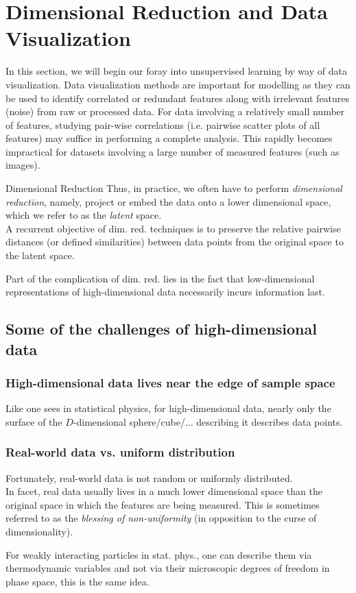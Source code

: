 \section{Dimensional Reduction and Data Visualization}
\label{sec:dimRed}
In this section, we will begin our foray into unsupervised learning by way of data visualization. Data visualization methods are important for modelling as they can be used to identify correlated or redundant features along with irrelevant features (noise) from raw or processed data. For data involving a relatively small number of features, studying pair-wise correlations (i.e. pairwise scatter plots of all features) may suffice in performing a complete analysis. This rapidly becomes impractical for datasets involving a large number of measured features (such as images). \begin{mybox}{Dimensional Reduction}
	Thus, in practice, we often have to perform \emph{dimensional reduction}, namely, project or embed the data onto a lower dimensional space, which we refer to as the \emph{latent} space.\\
	A recurrent objective of dim. red. techniques is to preserve the relative pairwise distances (or defined similarities) between data points from the original space to the latent space.
\end{mybox}
Part of the complication of dim. red. lies in the fact that low-dimensional representations of high-dimensional data necessarily incurs information last.

\subsection{Some of the challenges of high-dimensional data}
\label{subsec:dimRedChallengesData}
\subsubsection{High-dimensional data lives near the edge of sample space}
Like one sees in statistical physics, for high-dimensional data, nearly only the surface of the $D$-dimensional sphere/cube/... describing it describes data points.

\subsubsection{Real-world data vs. uniform distribution}
Fortunately, real-world data is not random or uniformly distributed.\\
In facet, real data usually lives in a much lower dimensional space than the original space in which the features are being measured. This is sometimes referred to as the \emph{blessing of non-uniformity} (in opposition to the curse of dimensionality). 
\begin{example}
	For weakly interacting particles in stat. phys., one can describe them via thermodynamic variables and not via their microscopic degrees of freedom in phase space, this is the same idea.
\end{example}

